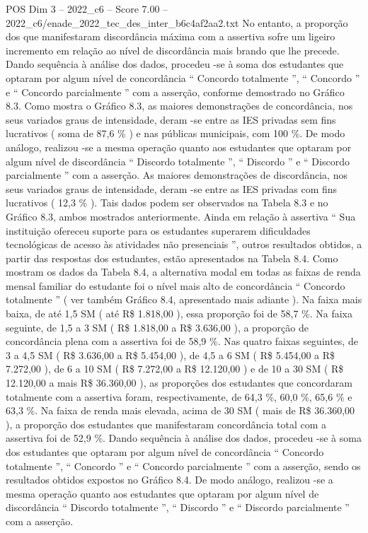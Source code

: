 \begin{textsample}{POS Dim 3 – 2022\_c6 – Score 7.00 – 2022\_c6/enade\_2022\_tec\_des\_inter\_b6c4af2aa2.txt}
No entanto, a proporção dos que manifestaram discordância máxima com a assertiva sofre um ligeiro incremento em relação ao nível de discordância mais brando que lhe precede.
Dando sequência à análise dos dados, procedeu -se à soma dos estudantes que optaram por algum nível de concordância “ Concordo totalmente ”, “ Concordo ” e “ Concordo parcialmente ” com a asserção, conforme demostrado no Gráfico 8.3.
Como mostra o Gráfico 8.3, as maiores demonstrações de concordância, nos seus variados graus de intensidade, deram -se entre as IES privadas sem fins lucrativos ( soma de 87,6 \% ) e nas públicas municipais, com 100 \%.
De modo análogo, realizou -se a mesma operação quanto aos estudantes que optaram por algum nível de discordância “ Discordo totalmente ”, “ Discordo ” e “ Discordo parcialmente ” com a asserção.
As maiores demonstrações de discordância, nos seus variados graus de intensidade, deram -se entre as IES privadas com fins lucrativos ( 12,3 \% ).
Tais dados podem ser observados na Tabela 8.3 e no Gráfico 8.3, ambos mostrados anteriormente.
Ainda em relação à assertiva “ Sua instituição ofereceu suporte para os estudantes superarem dificuldades tecnológicas de acesso às atividades não presenciais ”, outros resultados obtidos, a partir das respostas dos estudantes, estão apresentados na Tabela 8.4.
Como mostram os dados da Tabela 8.4, a alternativa modal em todas as faixas de renda mensal familiar do estudante foi o nível mais alto de concordância “ Concordo totalmente ” ( ver também Gráfico 8.4, apresentado mais adiante ).
Na faixa mais baixa, de até 1,5 SM ( até R\$ 1.818,00 ), essa proporção foi de 58,7 \%.
Na faixa seguinte, de 1,5 a 3 SM ( R\$ 1.818,00 a R\$ 3.636,00 ), a proporção de concordância plena com a assertiva foi de 58,9 \%.
Nas quatro faixas seguintes, de 3 a 4,5 SM ( R\$ 3.636,00 a R\$ 5.454,00 ), de 4,5 a 6 SM ( R\$ 5.454,00 a R\$ 7.272,00 ), de 6 a 10 SM ( R\$ 7.272,00 a R\$ 12.120,00 ) e de 10 a 30 SM ( R\$ 12.120,00 a mais R\$ 36.360,00 ), as proporções dos estudantes que concordaram totalmente com a assertiva foram, respectivamente, de 64,3 \%, 60,0 \%, 65,6 \% e 63,3 \%.
Na faixa de renda mais elevada, acima de 30 SM ( mais de R\$ 36.360,00 ), a proporção dos estudantes que manifestaram concordância total com a assertiva foi de 52,9 \%.
Dando sequência à análise dos dados, procedeu -se à soma dos estudantes que optaram por algum nível de concordância “ Concordo totalmente ”, “ Concordo ” e “ Concordo parcialmente ” com a asserção, sendo os resultados obtidos expostos no Gráfico 8.4.
De modo análogo, realizou -se a mesma operação quanto aos estudantes que optaram por algum nível de discordância “ Discordo totalmente ”, “ Discordo ” e “ Discordo parcialmente ” com a asserção.

\end{textsample}
